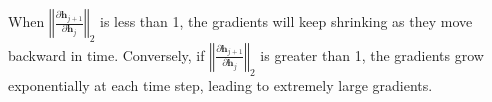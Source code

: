 
When $\left\Vert \frac{\partial \bm{h}_{j+1}}{\partial \bm{h}_{j}} \right\Vert_2$ is less than 1, the gradients will keep shrinking as they move backward in time. Conversely, if $\left\Vert \frac{\partial \bm{h}_{j+1}}{\partial \bm{h}_{j}} \right\Vert_2$ is greater than 1, the gradients grow exponentially at each time step, leading to extremely large gradients. 







